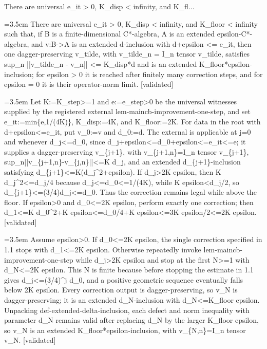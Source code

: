 \documentclass{article}
\newcommand{\step}[1]{\par\noindent\hangindent=3.5em\hangafter=1%
  \makebox[3.5em][l]{\textbf{#1.}}}
\newcommand{\steptag}[1]{\hfill{\small\textsf{[#1]}}}
\begin{document}
\begin{proofbox}{There are universal e\_it > 0, K\_disp < infinity, and K\_fl...}
\step{1} There are universal e\_it > 0, K\_disp < infinity, and K\_floor < infinity such that, if B is a finite-dimensional C*-algebra, A is an extended epsilon-C*-algebra, and v:B->A is an extended d-inclusion with d+epsilon <= e\_it, then one dagger-preserving v\_tilde, with v\_tilde\_n = I\_n tensor v\_tilde, satisfies sup\_n ||v\_tilde\_n - v\_n|| <= K\_disp*d and is an extended K\_floor*epsilon-inclusion; for epsilon > 0 it is reached after finitely many correction steps, and for epsilon = 0 it is their operator-norm limit. \steptag{validated} \\[6pt]
\step{1.1} Let K:=K\_step>=1 and e:=e\_step>0 be the universal witnesses supplied by the registered external lem-maincb-improvement-one-step, and set e\_it:=min\{e,1/(4K)\}, K\_disp:=4K, and K\_floor:=2K. For data in the root with d+epsilon<=e\_it, put v\_0:=v and d\_0:=d. The external is applicable at j=0 and whenever d\_j<=d\_0, since d\_j+epsilon<=d\_0+epsilon<=e\_it<=e; it supplies a dagger-preserving v\_\{j+1\}, with v\_\{j+1,n\}=I\_n tensor v\_\{j+1\}, sup\_n||v\_\{j+1,n\}-v\_\{j,n\}||<=K d\_j, and an extended d\_\{j+1\}-inclusion satisfying d\_\{j+1\}<=K(d\_j\textasciicircum{}2+epsilon). If d\_j>2K epsilon, then K d\_j\textasciicircum{}2<=d\_j/4 because d\_j<=d\_0<=1/(4K), while K epsilon<d\_j/2, so d\_\{j+1\}<=(3/4)d\_j<=d\_0. Thus the correction remains legal while above the floor. If epsilon>0 and d\_0<=2K epsilon, perform exactly one correction; then d\_1<=K d\_0\textasciicircum{}2+K epsilon<=d\_0/4+K epsilon<=3K epsilon/2<=2K epsilon. \steptag{validated} \\[4pt]
\step{1.2} Assume epsilon>0. If d\_0<=2K epsilon, the single correction specified in 1.1 stops with d\_1<=2K epsilon. Otherwise repeatedly invoke lem-maincb-improvement-one-step while d\_j>2K epsilon and stop at the first N>=1 with d\_N<=2K epsilon. This N is finite because before stopping the estimate in 1.1 gives d\_j<=(3/4)\textasciicircum{}j d\_0, and a positive geometric sequence eventually falls below 2K epsilon. Every correction output is dagger-preserving, so v\_N is dagger-preserving; it is an extended d\_N-inclusion with d\_N<=K\_floor epsilon. Unpacking def-extended-delta-inclusion, each defect and norm inequality with parameter d\_N remains valid after replacing d\_N by the larger K\_floor epsilon, so v\_N is an extended K\_floor*epsilon-inclusion, with v\_\{N,n\}=I\_n tensor v\_N. \steptag{validated} \\[4pt]

\end{proofbox}
\end{document}
